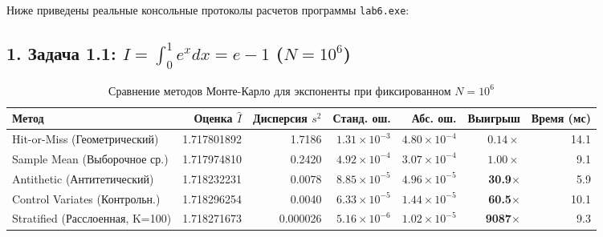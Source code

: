 \documentclass[11pt,a4paper]{article}
\begin{document}
Ниже приведены реальные консольные протоколы расчетов программы \texttt{lab6.exe}:

\subsection{1. Задача 1.1: $I = \int_0^1 e^x dx = e - 1$ ($N = 10^6$)}
\begin{table}[h!]
\centering
\small
\begin{tabular}{lrrrrrr}
\toprule
\textbf{Метод} & \textbf{Оценка $\hat{I}$} & \textbf{Дисперсия $s^2$} & \textbf{Станд. ош.} & \textbf{Абс. ош.} & \textbf{Выигрыш} & \textbf{Время (мс)} \\
\midrule
Hit-or-Miss (Геометрический) & 1.717801892 & 1.7186 & $1.31 \times 10^{-3}$ & $4.80 \times 10^{-4}$ & $0.14\times$ & 14.1 \\
Sample Mean (Выборочное ср.) & 1.717974810 & 0.2420 & $4.92 \times 10^{-4}$ & $3.07 \times 10^{-4}$ & $1.00\times$ & 9.1 \\
Antithetic (Антитетический) & 1.718232231 & 0.0078 & $8.85 \times 10^{-5}$ & $4.96 \times 10^{-5}$ & \textbf{30.9$\times$} & 5.9 \\
Control Variates (Контрольн.) & 1.718296254 & 0.0040 & $6.33 \times 10^{-5}$ & $1.44 \times 10^{-5}$ & \textbf{60.5$\times$} & 10.1 \\
Stratified (Расслоенная, K=100)& 1.718271673 & 0.000026 & $5.16 \times 10^{-6}$ & $1.02 \times 10^{-5}$ & \textbf{9087$\times$} & 9.3 \\
\bottomrule
\end{tabular}
\caption{Сравнение методов Монте-Карло для экспоненты при фиксированном $N = 10^6$}
\end{table}
\end{document}
